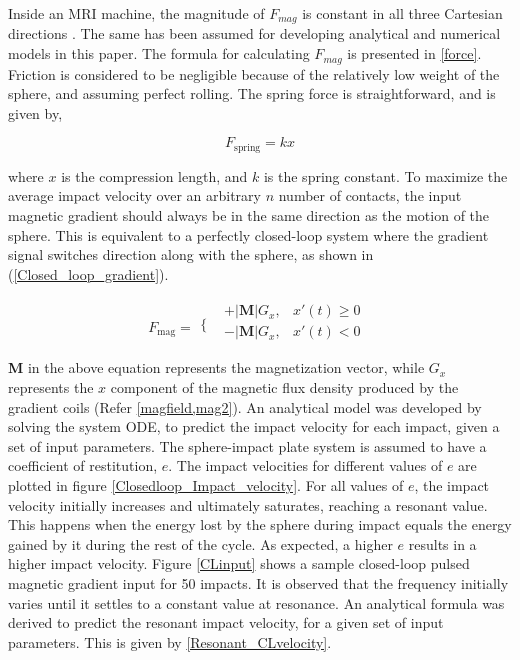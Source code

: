 \documentclass[letterpaper, 10 pt, conference]{ieeeconf}  %
\begin{document}
Inside an MRI machine, the magnitude of $F_{mag}$ is constant in all three Cartesian directions \cite{CMR:CMR20163}. The same has been assumed for developing analytical and numerical models in this paper. The formula for calculating $F_{mag}$ is presented in  \cref{force}. Friction is considered to be negligible because of the relatively low weight of the sphere, and assuming perfect rolling. The spring force is straightforward, and is given by,

\begin{equation}
F_{\text{spring}}=k x
\label{spring_force}
\end{equation}

where $x$ is the compression length, and $k$ is the spring constant. To maximize the average impact velocity over an arbitrary $n$ number of contacts, the input magnetic gradient should always be in the same direction as the motion of the sphere. This is equivalent to a perfectly closed-loop system where the gradient signal switches direction along with the sphere, as shown in (\ref{Closed_loop_gradient}).

\begin{equation}
F_{\text{mag}}=
\begin{array}{cc}
\{ & 
\begin{array}{cc}
+\left|\mathbf{M}\right|  G_x, &x' (t)\geq 0 \\
-\left|\mathbf{M}\right|  G_x, &x' (t)<0 \\
\end{array}
\\
\end{array}
\label{Closed_loop_gradient}
\end{equation}
\linebreak
\textbf{M} in the above equation represents the magnetization vector, while $G_x$ represents the $x$ component of the magnetic flux density produced by the gradient coils (Refer \cref{magfield,mag2}). An analytical model was developed by solving the system ODE, to predict the impact velocity for each impact, given a set of input parameters. The sphere-impact plate system is assumed to have a coefficient of restitution, $e$. The impact velocities for different values of $e$ are plotted in figure \ref{Closedloop_Impact_velocity}.
For all values of $e$, the impact velocity initially increases and ultimately saturates, reaching a resonant value. This happens when the energy lost by the sphere during impact equals the energy gained by it during the rest of the cycle. As expected, a higher $e$ results in a higher impact velocity. Figure \ref{CLinput} shows a sample closed-loop pulsed magnetic gradient input for 50 impacts. It is observed that the frequency initially varies until it settles to a constant value at resonance. An analytical formula was derived to predict the resonant impact velocity, for a given set of input parameters. This is given by \cref{Resonant_CLvelocity}.
\end{document}
